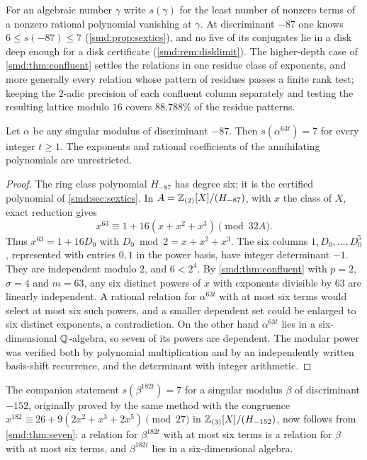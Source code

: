 For an algebraic number $\gamma$ write $s(\gamma)$ for the least number of nonzero terms
of a nonzero rational polynomial vanishing at $\gamma$. At discriminant $-87$ one knows
$6\le s(-87)\le7$ (\cref{smd:prop:sextics}), and no five of its conjugates lie in a disk deep enough for a
disk certificate (\cref{smd:rem:disklimit}). The higher-depth case of
\cref{smd:thm:confluent} settles the relations in one residue class of exponents, and more
generally every relation whose pattern of residues passes a finite rank test; keeping the
$2$-adic precision of each confluent column separately and testing the resulting lattice
modulo $16$ covers $88.788\%$ of the residue patterns.

\begin{theorem}\label{smd:thm:powered}
Let $\alpha$ be any singular modulus of discriminant $-87$. Then $s(\alpha^{63t})=7$ for
every integer $t\ge1$. The exponents and rational coefficients of the annihilating
polynomials are unrestricted.
\end{theorem}

\begin{proof}
The ring class polynomial $H_{-87}$ has degree six; it is the certified polynomial of
\cref{smd:sec:sextics}. In $A=\mathbb{Z}_{(2)}[X]/(H_{-87})$, with $x$ the class of $X$, exact
reduction gives
\[
 x^{63}\equiv1+16(x+x^2+x^3)\pmod{32A}.
\]
Thus $x^{63}=1+16D_0$ with $D_0\bmod2=x+x^2+x^3$. The six columns $1,D_0,\dots,D_0^5$,
represented with entries $0,1$ in the power basis, have integer determinant $-1$. They are
independent modulo $2$, and $6<2^4$. By \cref{smd:thm:confluent} with $p=2$, $\sigma=4$ and
$m=63$, any six distinct powers of $x$ with exponents divisible by $63$ are linearly
independent. A rational relation for $\alpha^{63t}$ with at most six terms would select at
most six such powers, and a smaller dependent set could be enlarged to six distinct
exponents, a contradiction. On the other hand $\alpha^{63t}$ lies in a six-dimensional
$\mathbb{Q}$-algebra, so seven of its powers are dependent. The modular power was verified both by
polynomial multiplication and by an independently written basis-shift recurrence, and the
determinant with integer arithmetic.
\end{proof}

The companion statement $s(\beta^{182t})=7$ for a singular modulus $\beta$ of discriminant
$-152$, originally proved by the same method with the congruence
$x^{182}\equiv26+9(2x^2+x^3+2x^5)\pmod{27}$ in $\mathbb{Z}_{(3)}[X]/(H_{-152})$, now follows from
\cref{smd:thm:seven}: a relation for $\beta^{182t}$ with at most six terms is a relation for
$\beta$ with at most six terms, and $\beta^{182t}$ lies in a six-dimensional algebra.

